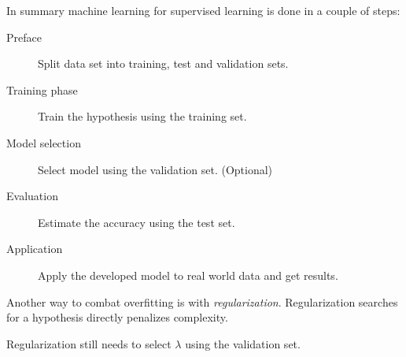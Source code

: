 In summary machine learning for supervised learning is done in a couple of steps:

\begin{description}
    \item[Preface] Split data set into training, test and validation sets.
    \item[Training phase] Train the hypothesis using the training set.
    \item[Model selection] Select model using the validation set. (Optional)
    \item[Evaluation] Estimate the accuracy using the test set.
    \item[Application] Apply the developed model to real world data and get results.
\end{description}

Another way to combat overfitting is with \textit{regularization}. Regularization searches for a hypothesis directly penalizes complexity.
\citep{norvigAI}

Regularization still needs to select $\lambda$ using the validation set.

